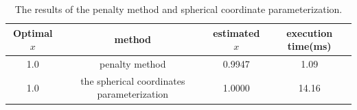 \documentclass[a4paper,12pt]{article}
\begin{document}
\begin{table}[!ht]
\begin{center}
\begin{tabular}{|c|c|c|c|}
\hline
Optimal $x$& method & estimated $x$&execution time(ms)\\
\hline
1.0& penalty method&0.9947&1.09\\
\hline
1.0&  the spherical coordinates parameterization&1.0000&14.16\\

\hline
\end{tabular}
\end{center}
\caption{The results of the penalty method and spherical coordinate parameterization.}
\label{tab:line}
\end{table}










  
 
\end{document}

